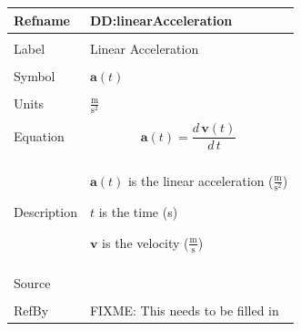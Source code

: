 \documentclass[12pt]{article}
\begin{document}
\noindent \begin{minipage}{\textwidth}
\begin{tabular}{p{} p{}}
\toprule \textbf{Refname} & \textbf{DD:linearAcceleration}
\label{DD:linearAcceleration}
\\ \midrule \\
Label & Linear Acceleration
\\ \midrule \\
Symbol & $\mathbf{a}(t)$
\\ \midrule \\
Units & $\frac{\text{m}}{\text{s}^{2}}$
\\ \midrule \\
Equation & \begin{dmath}
           \mathbf{a}(t)=\frac{d\,\mathbf{v}\left(t\right)}{d\,t}
           \end{dmath}
\\ \midrule \\
Description & \begin{symbDescription}
              \item{$\mathbf{a}(t)$ is the linear acceleration ($\frac{\text{m}}{\text{s}^{2}}$)}
              \item{$t$ is the time (s)}
              \item{$\mathbf{v}$ is the velocity ($\frac{\text{m}}{\text{s}}$)}
              \end{symbDescription}
\\ \midrule \\
Source & 
\\ \midrule \\
RefBy & FIXME: This needs to be filled in
\\ \bottomrule \end{tabular}
\end{minipage}\\
~\newline
\end{document}
